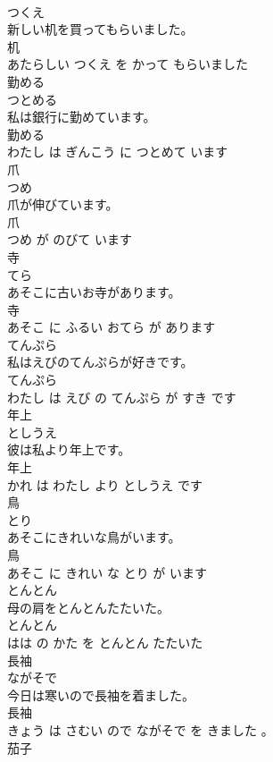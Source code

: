 \documentclass[8pt]{extreport}
\begin{document}
\begin{CJK}{UTF8}{min}
\\	つくえ			
\\	新しい机を買ってもらいました。	
\\	机 
\\	あたらしい つくえ を かって もらいました			
\\	勤める	
\\	つとめる			
\\	私は銀行に勤めています。	
\\	勤める 
\\	わたし は ぎんこう に つとめて います			
\\	爪	
\\	つめ			
\\	爪が伸びています。	
\\	爪 
\\	つめ が のびて います			
\\	寺	
\\	てら			
\\	あそこに古いお寺があります。	
\\	寺 
\\	あそこ に ふるい おてら が あります			
\\	てんぷら	
\\	私はえびのてんぷらが好きです。	
\\	てんぷら 
\\	わたし は えび の てんぷら が すき です			
\\	年上	
\\	としうえ			
\\	彼は私より年上です。	
\\	年上 
\\	かれ は わたし より としうえ です			
\\	鳥	
\\	とり			
\\	あそこにきれいな鳥がいます。	
\\	鳥 
\\	あそこ に きれい な とり が います			
\\	とんとん	
\\	母の肩をとんとんたたいた。	
\\	とんとん 
\\	はは の かた を とんとん たたいた			
\\	長袖	
\\	ながそで			
\\	今日は寒いので長袖を着ました。	
\\	長袖 
\\	きょう は さむい ので ながそで を きました 。			
\\	茄子	

\end{CJK}
\end{document}
